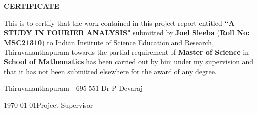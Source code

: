 \begin{center}
  {\Large{\bf{CERTIFICATE}}}
\end{center}

\vspace{2em}

This is to certify that the work contained in this project report entitled \textbf{``A STUDY IN FOURIER ANALYSIS"}  submitted by \textbf{Joel Sleeba} (\textbf{Roll No: MSC21310}) to Indian Institute of Science Education and Research, Thiruvananthapuram towards the partial requirement of {\bf Master of Science} in \textbf{School of Mathematics} has been carried out by him under my supervision and that it has not been submitted elsewhere for the award of any degree.


\vspace{3em}

\noindent Thiruvananthapuram - 695 551 \hfill Dr P Devaraj

\noindent \today \hfill Project Supervisor

\clearpage
